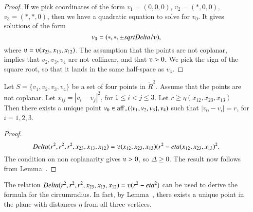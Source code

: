 \begin{tarskidata}
\begin{tarski}
\begin{proof} If we pick coordinates of the form $v_1=(0,0,0)$,
$v_2=(*,0,0)$, $v_3=(*,*,0)$, then we have a quadratic equation to
solve for $v_0$.  It gives solutions of the form
   $$
   v_0 = (*,*,\pm\sqrt{\Delta/\ups}),
   $$
where $\ups = \ups(x_{23},x_{13},x_{12})$.  The assumption that the points
are not coplanar, implies that $v_2,v_3,v_4$ are not collinear, and that
$\ups>0$.  We pick the sign of the square root, so that it lands in the
same half-space as $v_4$.  
\end{proof}
\end{tarski}





\begin{tarski}

\begin{lemma}
Let $S=\{v_1,v_2,v_3,v_4\}$ be a set of four points
in $\ring{R}^3$.  Assume that the points are not coplanar.
Let $x_{ij} = |v_i-v_j|^2$, for $1\le i < j\le 3$.
Let $r\ge \eta(x_{12},x_{23},x_{13})$ 
Then there exists a unique point $v_0\in{\operatorname{aff}}_+(\{v_1,v_2,v_3\},v_4)$
such that
   $|v_0-v_i| = r$, for $i=1,2,3$.
\end{lemma}

\begin{proof}
$$\Delta(r^2,r^2,r^2,x_{23},x_{13},x_{12})=
   \ups(x_{12},x_{23},x_{13}) (r^2-\eta(x_{12},x_{23},x_{13})^2.$$
The condition on non coplanarity gives $\ups>0$, so
$\Delta\ge0$.  The result now follows from Lemma~. 
\end{proof}
\end{tarski}



\begin{remark} 
The relation 
$\Delta(r^2,r^2,r^2,x_{23},x_{13},x_{12})=\ups (r^2-\eta^2)$
can be used to derive the formula for the circumradius. In fact,
by Lemma~, there exists a unique point
in the plane with distances $\eta$ from all three vertices.
\end{remark}



\begin{tarski}


\end{tarski}
\end{tarskidata}
